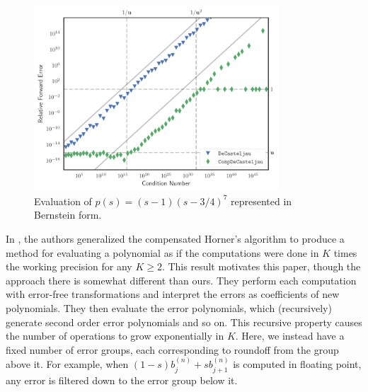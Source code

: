 \documentclass[letterpaper,10pt]{article}
\theoremstyle{definition}
\begin{document}
\begin{figure}
  \includegraphics[width=0.8125\textwidth]{../images/jlcs10_plot.pdf}
  \centering
  \caption{Evaluation of \(p(s) = (s - 1)\left(s - 3/4\right)^7\)
    represented in Bernstein form.}
  \label{fig:jlcs-10}
\end{figure}

In \cite{Graillat2009}, the authors generalized the compensated Horner's
algorithm to produce a method for evaluating a polynomial as if
the computations were done in \(K\) times the working precision for
any \(K \geq 2\). This result motivates this paper, though the
approach there is somewhat different than ours. They perform each computation
with error-free transformations and interpret the errors as coefficients of new
polynomials. They then evaluate the error polynomials, which (recursively)
generate second order error polynomials and so on. This recursive property
causes the number of operations to grow exponentially in \(K\). Here, we
instead have a fixed number of error groups, each corresponding to roundoff
from the group above it. For example, when
\((1 - s) b_j^{(n)} + s b_{j + 1}^{(n)}\) is computed in floating point, any
error is filtered down to the error group below it.
\end{document}
